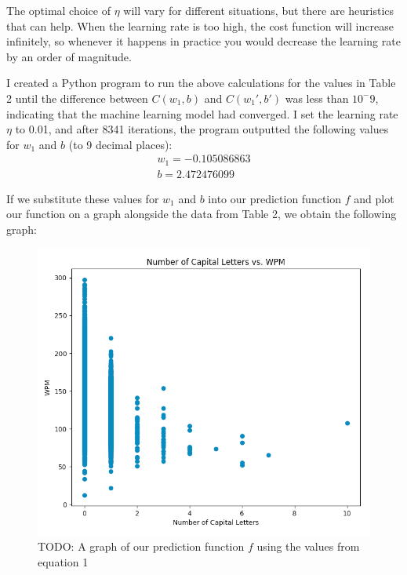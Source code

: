 \documentclass[12pt]{article}
\begin{document}
The optimal choice of $\eta$ will vary for different situations, but there are heuristics that can help. When the learning rate is too high, the cost function will increase infinitely, so whenever it happens in practice you would decrease the learning rate by an order of magnitude.

I created a Python program to run the above calculations for the values in Table 2 until the difference between $C(w_1, b)$ and $C(w_1', b')$ was less than $10^-9$, indicating that the machine learning model had converged. I set the learning rate $\eta$ to 0.01, and after 8341 iterations, the program outputted the following values for $w_1$ and $b$ (to 9 decimal places):
\begin{align}
	w_1 = -0.105086863 \\
	b = 2.472476099
\end{align}

If we substitute these values for $w_1$ and $b$ into our prediction function $f$ and plot our function on a graph alongside the data from Table 2, we obtain the following graph:
\begin{figure}[H]
	\centering
	\caption{TODO: A graph of our prediction function $f$ using the values from equation 1}
	\includegraphics{todo.png}
\end{figure}
\end{document}
